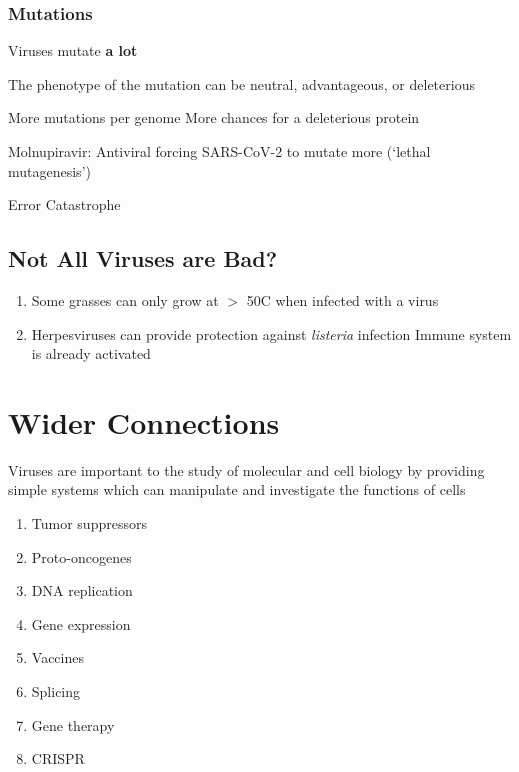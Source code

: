 \documentclass{notes}
\begin{document}
\subsubsection{Mutations}

Viruses mutate \textbf{a lot}


The phenotype of the mutation can be neutral, advantageous, or deleterious

More mutations per genome \indicates More chances for a deleterious protein


Molnupiravir: Antiviral forcing SARS-CoV-2 to mutate more (`lethal mutagenesis')

\tab \indicates Error Catastrophe

\subsection{Not All Viruses are Bad?}

\begin{enumerate}
    \item Some grasses can only grow at \(>\) 50\degree C when infected with a virus
    \item Herpesviruses can provide protection against \textit{listeria} infection
    \subitem Immune system is already activated
\end{enumerate}

\section{Wider Connections}

Viruses are important to the study of molecular and cell biology by providing simple systems which can manipulate and investigate the functions of cells

\begin{enumerate}
    \item Tumor suppressors
    \item Proto-oncogenes
    \item DNA replication
    \item Gene expression
    \item Vaccines
    \item Splicing
    \item Gene therapy
    \item CRISPR
\end{enumerate}
\end{document}
